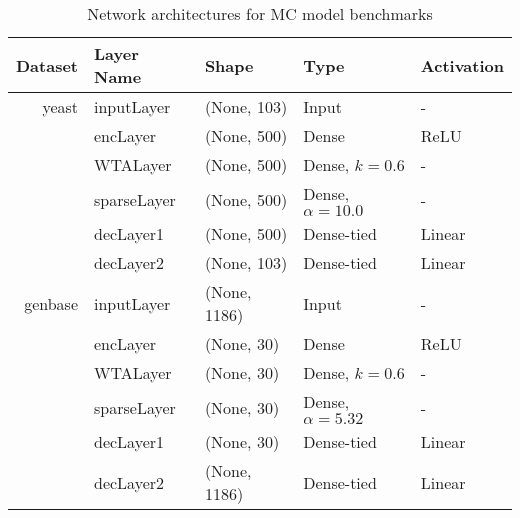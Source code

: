 \begin{table}[!h]
    \centering
    \caption{Network architectures for MC model benchmarks}
    \begin{tabular}{@{}r*{4}{l}@{}}
    \toprule
    Dataset & Layer Name     & Shape        & Type           & Activation          \\ \midrule
    yeast   & inputLayer     & (None, 103)  & Input          & -                   \\
            & encLayer       & (None, 500)  & Dense          & ReLU                \\
            & WTALayer       & (None, 500)  & Dense, $k=0.6$ & -                   \\
            & sparseLayer    & (None, 500)  & Dense, $\alpha=10.0$ & -             \\
            & decLayer1      & (None, 500)  & Dense-tied     & Linear              \\
            & decLayer2      & (None, 103)  & Dense-tied     & Linear              \\ \midrule
    genbase & inputLayer     & (None, 1186) & Input          & -                   \\
            & encLayer       & (None, 30)   & Dense          & ReLU                \\
            & WTALayer       & (None, 30)   & Dense, $k=0.6$ & -                   \\
            & sparseLayer    & (None, 30)   & Dense, $\alpha=5.32$ & -             \\
            & decLayer1       & (None, 30)   & Dense-tied     & Linear              \\
            & decLayer2       & (None, 1186) & Dense-tied     & Linear               \\ \bottomrule
    \end{tabular}
\end{table}
